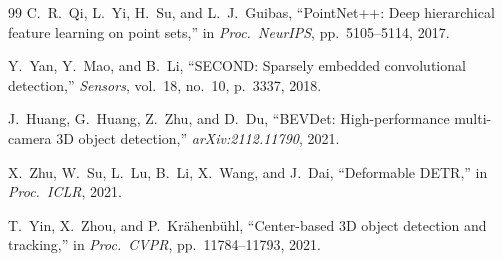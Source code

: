 \documentclass[12pt, a4paper]{article}
\theoremstyle{definition}
\begin{document}
\begin{thebibliography}{99}
C.~R.~Qi, L.~Yi, H.~Su, and L.~J.~Guibas,
``PointNet++: Deep hierarchical feature learning on point sets,''
in \emph{Proc.\ NeurIPS}, pp.~5105--5114, 2017.

Y.~Yan, Y.~Mao, and B.~Li,
``SECOND: Sparsely embedded convolutional detection,''
\emph{Sensors}, vol.~18, no.~10, p.~3337, 2018.

J.~Huang, G.~Huang, Z.~Zhu, and D.~Du,
``BEVDet: High-performance multi-camera 3D object detection,''
\emph{arXiv:2112.11790}, 2021.

X.~Zhu, W.~Su, L.~Lu, B.~Li, X.~Wang, and J.~Dai,
``Deformable DETR,''
in \emph{Proc.\ ICLR}, 2021.

T.~Yin, X.~Zhou, and P.~Kr\"{a}henb\"{u}hl,
``Center-based 3D object detection and tracking,''
in \emph{Proc.\ CVPR}, pp.~11784--11793, 2021.

\end{thebibliography}
\end{document}
